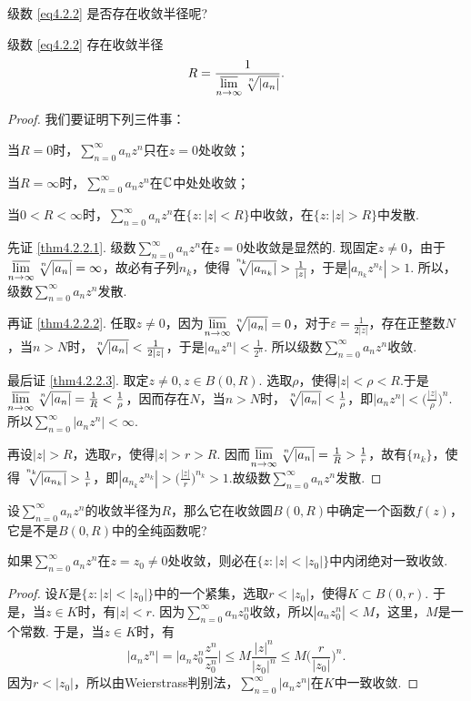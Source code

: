 级数 \eqref{eq4.2.2} 是否存在收敛半径呢?
\begin{theorem}\label{thm4.2.2}
  级数  \eqref{eq4.2.2} 存在收敛半径
  \[
    R = \frac1{\varlimsup\limits_{n\to\infty} \sqrt[\leftroot{-1}\uproot{2}n]{|a_n|}}.
  \]
\end{theorem}
\begin{proof}
  我们要证明下列三件事：
  \begin{eenum}
    \item \label{thm4.2.2.1}当$R=0$时，$\sum_{n=0}^\infty a_nz^n$只在$z=0$处收敛；
    \item \label{thm4.2.2.2}当$R=\infty$时，$\sum_{n=0}^\infty a_nz^n$在$\mathbb C$中处处收敛；
    \item \label{thm4.2.2.3}当$0<R<\infty$时，$\sum_{n=0}^\infty a_nz^n$在$\{z:|z|<R\}$中收敛，在$\{z:|z|>R\}$中发散.
  \end{eenum}

  先证 \ref{thm4.2.2.1}. 级数$\sum_{n=0}^\infty a_nz^n$在$z=0$处收敛是显然的. 现固定$z\ne0$，由于$\varlimsup\limits_{n\to\infty}\sqrt[\leftroot{-1}\uproot{2}n]{|a_n|}=\infty$，故必有子列$n_k$，使得$
  \sqrt[\leftroot{-3}\uproot{8}n_k]{|a_{n_k}|}>\frac1{|z|}$，于是$|a_{n_k}z^{n_k}|>1$. 所以，级数$\sum_{n=0}^\infty a_nz^n$发散.

  再证 \ref{thm4.2.2.2}. 任取$z\ne0$，因为$\varlimsup\limits_ {n\to\infty}\sqrt[\leftroot{-1}\uproot{2}n]{|a_n|}=0$，对于$\varepsilon=\frac1{2|z|}$，存在正整数$N$，当$n>N$时，$\sqrt[\leftroot{-1}\uproot{2}n]{|a_n|}<\frac1{2|z|}$，于是$|a_nz^n|<\frac1{2^n}$. 所以级数$\sum_{n=0}^\infty a_nz^n$收敛.

  最后证 \ref{thm4.2.2.3}. 取定$z\ne0,z\in B(0,R)$. 选取$\rho$，使得$|z|<\rho<R$.于是
  $\varlimsup\limits_ {n\to\infty}\sqrt[\leftroot{-1}\uproot{2}n]{|a_n|}=\frac1R<\frac1\rho$，因而存在$N$，当$n>N$时，$\sqrt[\leftroot{-1}\uproot{2}n]{|a_n|}<\frac1\rho$，即$|a_nz^n|<\bigg(
  \frac{|z|}\rho\bigg)^n$. 所以$\sum_{n=0}^\infty|a_nz^n|<\infty$.

  再设$|z|>R$，选取$r$，使得$|z|>r>R$. 因而$\varlimsup\limits_ {n\to\infty}\sqrt[\leftroot{-1}\uproot{2}n]{|a_n|}=\frac1R>\frac1r$，故有$\{n_k\}$，使得$
  \sqrt[\leftroot{-3}\uproot{8}n_k]{|a_{n_k}|}>\frac1r$，即$|a_{n_k}z^{n_k}|>\bigg(\frac{|z|}r\bigg)^{n_k}>1$.故级数$\sum_{n=0}^\infty a_nz^n$发散.
\end{proof}

设$\sum_{n=0}^\infty a_nz^n$的收敛半径为$R$，那么它在收敛圆$B(0,R)$中确定一个函数$f(z)$，它是不是$B(0,R)$中的全纯函数呢?
\begin{theorem}\label{thm4.2.3}
  如果$\sum_{n=0}^\infty a_nz^n$在$z=z_0\ne0$处收敛，则必在$\{z:|z|<|z_0|\}$中内闭绝对一致收敛.
\end{theorem}
\begin{proof}
  设$K$是$\{z:|z|<|z_0|\}$中的一个紧集，选取$r<|z_0|$，使得$K\subset B(0,r)$. 于是，当$z\in K$时，有$|z|<r$. 因为$\sum_{n=0}^\infty a_nz_0^n$收敛，所以$|a_nz_0^n|<M$，这里，$M$是一个常数. 于是，当$z\in K$时，有
  \[
    |a_nz^n| = \bigg| a_nz_0^n\frac{z^n}{z_0^n} \bigg| \le M\frac{|z|^n}{|z_0|^n} \le
    M\bigg( \frac r{|z_0|} \bigg)^n.
  \]
  因为$r<|z_0|$，所以由Weierstrass判别法，$\sum_{n=0}^\infty|a_nz^n|$在$K$中一致收敛.
\end{proof}

